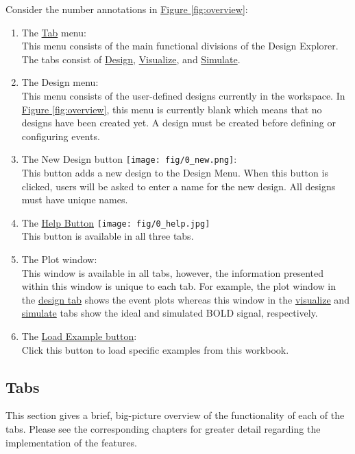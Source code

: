 \documentclass[10pt]{article}
\newcommand*{\hbut}{\texttt{[image: fig/0\_help.jpg]}}
\newcommand*{\nbut}{\texttt{[image: fig/0\_new.png]}}
\begin{document}
		Consider the number annotations in \hyperref[fig:overview]{Figure \ref{fig:overview}}:
		\begin{enumerate}
			\item The \hyperref[subsec:tabs]{Tab} menu: \\
			This menu consists of the main functional divisions of the Design Explorer.
			The tabs consist of \hyperref[subsubsec:design]{Design}, \hyperref[subsubsec:visualize]{Visualize}, and \hyperref[subsubsec:simulate]{Simulate}.
			\item The Design menu: \\
			This menu consists of the user-defined designs currently in the workspace.
			In \hyperref[fig:overview]{Figure \ref{fig:overview}}, this menu is currently blank which means that no designs have been created yet.
			A design must be created before defining or configuring events.
			\item The New Design button \nbut{}: \\
			This button adds a new design to the Design Menu.
			When this button is clicked, users will be asked to enter a name for the new design.
			All designs must have unique names.
			\item The \hyperref[subsubsec:hbut]{Help Button} \hbut{} \\
			This button is available in all three tabs.
			\item The Plot window: \\
			This window is available in all tabs, however, the information presented within this window is unique to each tab.
			For example, the plot window in the \hyperref[subsubsec:design]{design tab} shows the event plots whereas this window in the \hyperref[subsubsec:visualize]{visualize} and \hyperref[subsubsec:simulate]{simulate} tabs show the ideal and simulated BOLD signal, respectively.
			\item The \hyperref[subsubsec:example]{Load Example button}: \\
			Click this button to load specific examples from this workbook.  
		\end{enumerate}

	\subsection*{Tabs}
	\label{subsec:tabs}
		This section gives a brief, big-picture overview of the functionality of each of the tabs. Please see the corresponding chapters for greater detail regarding the implementation of the features.
\end{document}
